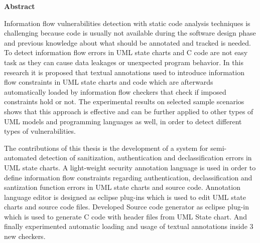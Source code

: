 

\clearemptydoublepage
{}
{}	





\vspace*{2cm}
\begin{center}
{\Large \bf Abstract}
\end{center}
\vspace{1cm}

Information flow vulnerabilities detection with static code analysis techniques is challenging because code
is usually not available during the software design phase and
previous knowledge about what should be annotated and tracked
is needed. To detect information flow errors in UML state
charts and C code are not easy task as they can cause data leakages or unexpected program behavior. In this research it is proposed that textual annotations used to
introduce information flow constraints in UML state charts and code which are afterwards automatically loaded by information flow checkers that check if imposed constraints hold or not. The experimental results on selected sample scenarios shows that this approach
is effective and can be further applied to other types of UML
models and programming languages as well, in order to detect
different types of vulnerabilities.

The contributions of this thesis is the development of a system for semi-automated detection of sanitization, authentication and declassification errors in UML state charts. A light-weight security annotation language is used in order to define information flow constraints regarding authentication, declassification and santization function errors  in UML state charts and source code.  Annotation language editor is designed as eclipse
plug-ins which is used to edit UML state charts and
source code files. Developed Source code generator as eclipse plug-in which is used to generate C code with header files from UML State chart. And finally experimented automatic loading and usage of textual annotations inside 3 new checkers.